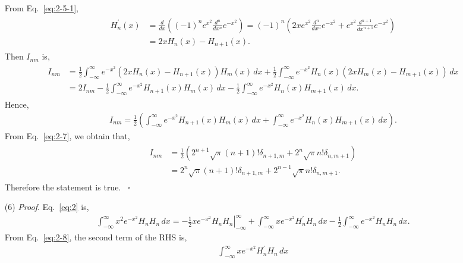 \documentclass[floatfix,nofootinbib,superscriptaddress,fleqn]{revtex4-2}
\begin{document}
\begin{itemize}
\begin{align*}
\begin{split}
  \end{split}
\end{align*}
From Eq.~\eqref{eq:2-5-1},
\begin{align}\label{eq:2-8}
  \begin{split}
    H^\prime_n(x) &= \frac{d}{dx}\left( (-1)^ne^{x^2}
    \frac{d^n}{dx^n}e^{-x^2} \right)
    =(-1)^n\left( 2xe^{x^2}\frac{d^n}{dx^n}e^{-x^2}
    +e^{x^2}\frac{d^{n+1}}{dx^{n+1}}e^{-x^2} \right)  \\
    &=2xH_n(x)-H_{n+1}(x).
  \end{split}
\end{align}
Then $I_{nm}$ is,
\begin{align*}
  \begin{split}
    I_{nm} &= \frac{1}{2}\int_{-\infty}^\infty 
    e^{-x^2}(2xH_n(x)-H_{n+1}(x))H_m(x) \,dx+
    \frac{1}{2}\int_{-\infty}^\infty 
    e^{-x^2}H_n(x)(2xH_m(x)-H_{m+1}(x)) \,dx  \\
    &= 2I_{nm}
    -\frac{1}{2}\int_{-\infty}^\infty 
    e^{-x^2}H_{n+1}(x)H_m(x) \,dx
    -\frac{1}{2}\int_{-\infty}^\infty 
    e^{-x^2}H_n(x)H_{m+1}(x) \,dx.
  \end{split}
\end{align*}
Hence,
\begin{align*}
  I_{nm}=\frac{1}{2}\left(\int_{-\infty}^\infty 
  e^{-x^2}H_{n+1}(x)H_m(x) \,dx
  +\int_{-\infty}^\infty 
  e^{-x^2}H_n(x)H_{m+1}(x) \,dx\right).
\end{align*}
From Eq.~\eqref{eq:2-7}, we obtain that,
\begin{align}\label{eq:2-9}
  \begin{split}
    I_{nm}&=\frac{1}{2}\left(2^{n+1}\sqrt{\pi}(n+1)!\delta_{n+1,m}
    +2^n\sqrt{\pi}n!\delta_{n,m+1} \right)  \\
    &=2^n\sqrt{\pi}(n+1)!\delta_{n+1,m}
    +2^{n-1}\sqrt{\pi}n!\delta_{n,m+1}.
  \end{split}
\end{align}
Therefore the statement is true. ~\hfill $\square$
\item[(6)] {\it Proof}. Eq.~\eqref{eq:2} is,
\begin{align*}
  \int_{-\infty}^\infty x^2e^{-x^2}H_nH_n \,dx  
  =-\left.\frac{1}{2}xe^{-x^2}H_nH_n\right|_{-\infty}^\infty
  +\int_{-\infty}^\infty xe^{-x^2}H_n^\prime H_n \,dx  
  -\frac{1}{2}\int_{-\infty}^\infty e^{-x^2}H_nH_n \,dx  .
\end{align*}
From Eq.~\eqref{eq:2-8}, the second term of the RHS is,
\begin{align*}
  \int_{-\infty}^\infty xe^{-x^2}H_n^\prime H_n \,dx  

\end{align*}
\end{itemize}
\end{document}
